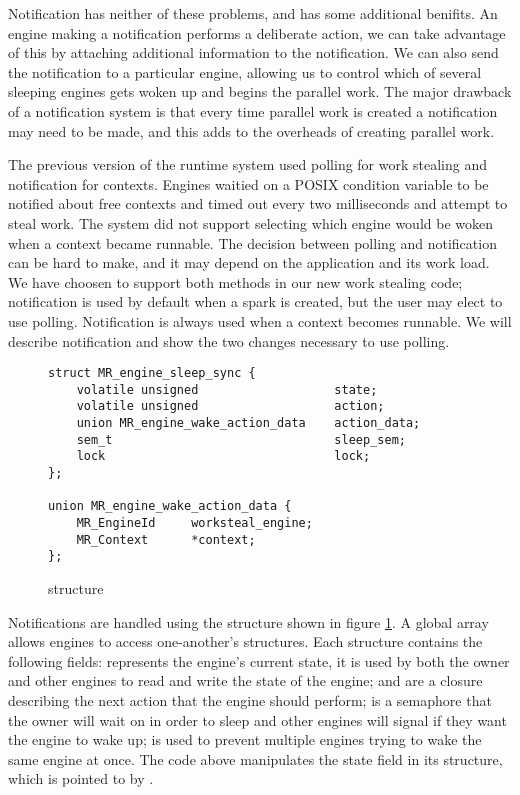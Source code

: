 Notification has neither of these problems, and has some additional
benifits.
An engine making a notification performs a deliberate action,
we can take advantage of this by attaching additional information to the
notification.
We can also send the notification to a particular engine,
allowing us to control which of several sleeping engines gets woken up and
begins the parallel work.
The major drawback of a notification system is that every time parallel work
is created a notification may need to be made,
and this adds to the overheads of creating parallel work.

The previous version of the runtime system used polling for work
stealing and notification for contexts.
Engines waitied on a POSIX condition variable to be notified about free
contexts and timed out every  two milliseconds and attempt to steal work.
The system did not support selecting which engine would be woken when a
context became runnable.
The decision between polling and notification can be hard to make,
and it may depend on the application and its work load. 
We have choosen to support both methods in our new work stealing code;
notification is used by default when a spark is created,
but the user may elect to use polling.
Notification is always used when a context becomes runnable. 
We will describe notification and show the two changes necessary to use
polling.

\begin{figure}
\begin{verbatim}
struct MR_engine_sleep_sync {
    volatile unsigned                   state;
    volatile unsigned                   action;
    union MR_engine_wake_action_data    action_data;
    sem_t                               sleep_sem;
    lock                                lock;
};

union MR_engine_wake_action_data {
    MR_EngineId     worksteal_engine;
    MR_Context      *context;
};
\end{verbatim}
\caption{\enginesleepsync structure}
\label{fig:engine_sleep_sync}
\end{figure}

Notifications are handled using the \enginesleepsync structure shown in
figure \ref{fig:engine_sleep_sync}.
A global array allows engines to access one-another's \enginesleepsync
structures.
Each structure contains the following fields:
 represents the engine's current state,
it is used by both the owner and other engines to read and write the state
of the engine;
 and  are a closure describing
the next action that the engine should perform;
 is a semaphore that the owner will wait on in order to
sleep and other engines will signal if they want the engine to wake up;
 is used to prevent multiple engines trying to wake the same
engine at once.
The \idle code above manipulates the state field in its structure,
which is pointed to by .


